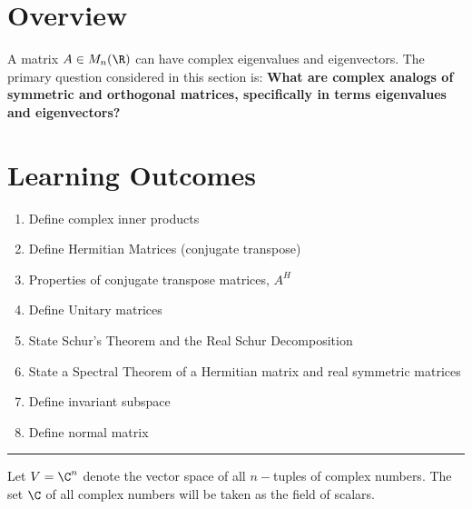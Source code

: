 %

\section*{Overview}
A matrix $A \in M_n(\R)$ can have complex eigenvalues and eigenvectors.  The primary question considered in this section is: \textbf{What are complex analogs of symmetric and orthogonal matrices, specifically in terms eigenvalues and eigenvectors?}


\section*{Learning Outcomes}
\begin{enumerate}
	\item Define complex inner products
	\item Define Hermitian Matrices (conjugate transpose)
	\item Properties of conjugate transpose matrices, $A^H$
    	\item Define Unitary matrices
	\item State Schur's Theorem and the Real Schur Decomposition
	\item State a Spectral Theorem of a Hermitian matrix and real symmetric matrices
	\item Define invariant subspace
	\item Define normal matrix
\end{enumerate}






\rule[0.01in]{\textwidth}{0.0025in}

Let $V = \C^n$ denote the vector space of all $n-$tuples of complex numbers.  The set $\C$ of all complex numbers will be taken as the field of scalars.


